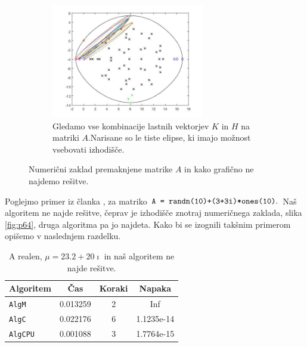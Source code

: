 \documentclass[12pt,a4paper]{amsart}
\theoremstyle{definition}
\theoremstyle{plain}
\begin{document}
\begin{figure}[H]
\begin{subfigure}[t]{0.45\textwidth}
\label{fig:p63}
\end{subfigure}%
\hfill
\begin{subfigure}[t]{0.45\textwidth}
\includegraphics[width=0.9\linewidth,height=5cm]{RC4e3.jpg}
\caption{Gledamo vse kombinacije lastnih vektorjev $K$ in $H$ na matriki $A$.\footnotemark[\value{footnote}] Narisane so le tiste elipse, ki imajo možnost vsebovati izhodišče.}
\label{fig:p63}
\end{subfigure}
\caption{Numerični zaklad premaknjene matrike $A$ in kako grafično ne najdemo rešitve.}
\label{fig:p6}
\end{figure}


Poglejmo primer iz članka \cite{trije}, za matriko $\verb-A = randn(10)+(3+3i)*ones(10)-.$ Naš algoritem ne najde rešitve, čeprav je izhodišče znotraj numeričnega zaklada, slika \ref{fig:p64}, druga algoritma pa jo najdeta. 
Kako bi se izognili takšnim primerom opišemo v naslednjem razdelku.



\begin{table}[H]
\caption{A realen, $\mu = 23.2 +20\imath$ in naš algoritem ne najde rešitve.}
\begin{tabular}{|l|c|c|c|}
\hline
Algoritem & Čas & Koraki & Napaka\\
\hline
\hline
\verb+AlgM+ &0.013259&2&Inf\\
\hline
\verb+AlgC+ &0.022176 &6&1.1235e-14\\
\hline
\verb+AlgCPU+ &0.001088&3&1.7764e-15\\
\hline
\end{tabular}

\label{t6}
\end{table}
\end{document}
